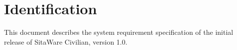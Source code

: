 \section{Identification}
This document describes the system requirement specification of the initial release of SitaWare Civilian, version 1.0.